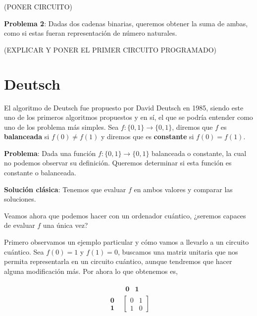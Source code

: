  (PONER CIRCUITO)

 \textbf{Problema 2}: Dadas dos cadenas binarias, queremos obtener la suma de ambas, como si estas fueran representación de número naturales.\newline

 (EXPLICAR Y PONER EL PRIMER CIRCUITO PROGRAMADO)

\section{Deutsch}
\label{Sec3.2:Deutsch}

 El algoritmo de Deutsch\cite{B:QuantumScientist:2008} fue propuesto por David Deutsch en 1985, siendo este uno de los primeros algoritmos propuestos y en sí, el que se podría entender como uno de los problema más simples. Sea $f:\{0,1\}\rightarrow\{0,1\}$, diremos que $f$ es \textbf{balanceada} si $f(0)\neq f(1)$ y diremos que es \textbf{constante} si $f(0)=f(1)$. \newline

 \textbf{Problema}: Dada una función $f:\{0,1\}\rightarrow\{0,1\}$ balanceada o constante, la cual no podemos observar su definición. Queremos determinar si esta función es constante o balanceada.\newline

 \textbf{Solución clásica}: Tenemos que evaluar $f$ en ambos valores y comparar las soluciones.\newline

 Veamos ahora que podemos hacer con un ordenador cuántico, ¿seremos capaces de evaluar $f$ una única vez? \newline

 Primero observamos un ejemplo particular y cómo vamos a llevarlo a un circuito cuántico. Sea $f(0)=1$ y $f(1)=0$, buscamos una matriz unitaria que nos permita representarla en un circuito cuántico, aunque tendremos que hacer alguna modificación más. Por ahora lo que obtenemos es,

 \begin{equation*}
     \begin{matrix}
           & \begin{matrix} \textbf{0} & \textbf{1} \end{matrix} \\
         \begin{matrix} \textbf{0} \\ \textbf{1} \end{matrix} & \begin{bmatrix}
             0 & 1 \\
             1 & 0
         \end{bmatrix}
     \end{matrix}
 \end{equation*}

